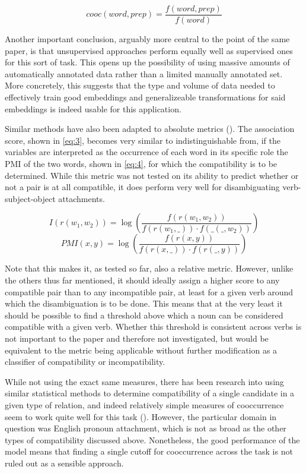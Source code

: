\documentclass[a4paper, 12pt]{article}
\begin{document}
\begin{equation} \label{eq:2}
	cooc(word, prep) = \frac{f(word, prep)}{f(word)}
\end{equation}

Another important conclusion, arguably more central to the point of the same paper, is that unsupervised approaches perform equally well as supervised ones for this sort of task. This opens up the possibility of using massive amounts of automatically annotated data rather than a limited manually annotated set. More concretely, this suggests that the type and volume of data needed to effectively train good embeddings and generalizeable transformations for said embeddings is indeed usable for this application.

Similar methods have also been adapted to absolute metrics (\cite{vanNoord}). The association score, shown in \ref{eq:3}, becomes very similar to \textemdash indistinguishable from, if the variables are interpreted as the occurrence of each word in its specific role \textemdash the PMI of the two words, shown in \ref{eq:4}, for which the compatibility is to be determined. While this metric was not tested on its ability to predict whether or not a pair is at all compatible, it does perform very well for disambiguating verb-subject-object attachments.

\begin{equation} \label{eq:3}
	I(r(w_1, w_2)) = \log\left(\frac{f(r(w_1, w_2))}{f(r(w_1, \_ )) \cdot f(\_ (\_ , w_2))}\right)
\end{equation}
\begin{equation} \label{eq:4}
	PMI(x, y) = \log\left(\frac{f(r(x, y))}{f(r(x, \_ )) \cdot f(r(\_ , y))}\right)
\end{equation}

Note that this makes it, as tested so far, also a relative metric. However, unlike the others thus far mentioned, it should ideally assign a higher score to any compatible pair than to any incompatible pair, at least for a given verb around which the disambiguation is to be done. This means that at the very least it should be possible to find a threshold above which a noun can be considered compatible with a given verb. Whether this threshold is consistent across verbs is not important to the paper and therefore not investigated, but would be equivalent to the metric being applicable without further modification as a classifier of compatibility or incompatibility.

While not using the exact same measures, there has been research into using similar statistical methods to determine compatibility of a single candidate in a given type of relation, and indeed relatively simple measures of cooccurrence seem to work quite well for this task (\cite{YangSuTan}). However, the particular domain in question was English pronoun attachment, which is not as broad as the other types of compatibility discussed above. Nonetheless, the good performance of the model means that finding a single cutoff for cooccurrence across the task is not ruled out as a sensible approach.
\end{document}
